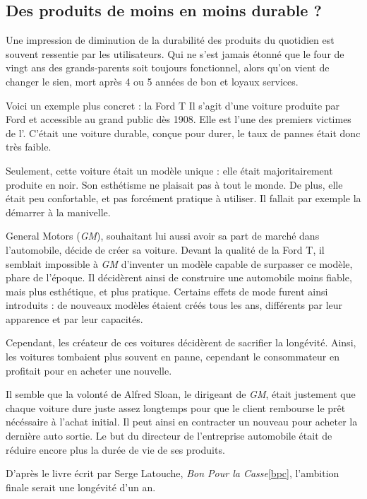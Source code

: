 \subsection{Des produits de moins en moins durable ?}

Une impression de diminution de la durabilité des produits du quotidien est souvent ressentie par les utilisateurs.  Qui ne s'est jamais étonné que le four de vingt ans des grands-parents soit toujours fonctionnel, alors qu'on vient de changer le sien, mort après 4 ou 5 années de bon et loyaux services. 

\smallbreak
Voici un exemple plus concret : la Ford T
Il s'agit d'une voiture produite par Ford et accessible au grand public dès 1908.
Elle est l'une des premiers victimes de l'\op.
C'était une voiture durable, conçue pour durer, le taux de pannes était donc très faible.   

Seulement, cette voiture était un modèle unique : elle était majoritairement produite en noir. Son esthétisme ne plaisait pas à tout le monde. De plus, elle était peu confortable, et pas forcément pratique à utiliser. Il fallait par exemple la démarrer à la manivelle. 

General Motors (\textit{GM}), souhaitant lui aussi avoir sa part de marché dans l'automobile, décide de créer sa voiture.
Devant la qualité de la Ford T, il semblait impossible à \textit{GM} d'inventer un modèle capable de surpasser ce modèle, phare de l'époque.
Il décidèrent ainsi de construire une automobile moins fiable, mais plus esthétique, et plus pratique.
Certains effets de mode furent ainsi introduits : de nouveaux modèles étaient créés tous les ans, différents par leur apparence et par leur capacités.

Cependant, les créateur de ces voitures décidèrent de sacrifier la longévité. Ainsi, les voitures tombaient plus souvent en panne, cependant le consommateur en profitait pour en acheter une nouvelle.

Il semble que la volonté de Alfred Sloan, le dirigeant de \textit{GM}, était justement que chaque voiture dure juste assez longtemps pour que le client rembourse le prêt nécéssaire à l'achat initial.
Il peut ainsi en contracter un nouveau pour acheter la dernière auto sortie. Le but du directeur de l'entreprise automobile était de réduire encore plus la durée de vie de ses produits.

D'après le livre écrit par Serge Latouche, \textit{Bon Pour la Casse}\ref{bpc}, l'ambition finale serait une longévité d'un an.

